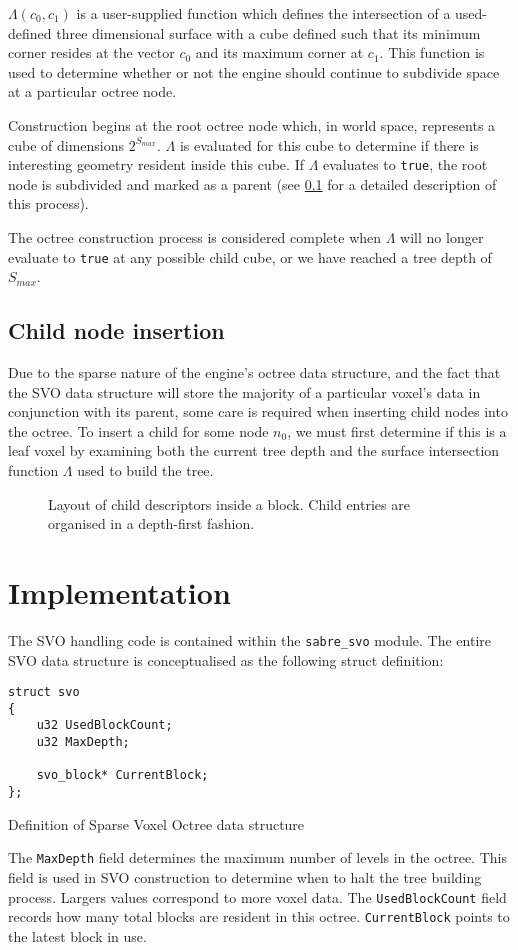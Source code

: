 $\Lambda(c_0, c_1)$ is a user-supplied function which defines the intersection of a used-defined three dimensional surface with a cube defined such that its minimum corner resides at the vector $c_0$ and its maximum corner at $c_1$. This function is used to determine whether or not the engine should continue to subdivide space at a particular octree node.

Construction begins at the root octree node which, in world space, represents a cube of dimensions $2^{S_{max}}$. $\Lambda$ is evaluated for this cube to determine if there is interesting geometry resident inside this cube. If $\Lambda$ evaluates to \texttt{true}, the root node is subdivided and marked as a parent (see \ref{child_node_insertion} for a detailed description of this process).

The octree construction process is considered complete when $\Lambda$ will no longer evaluate to \texttt{true} at any possible child cube, or we have reached a tree depth of $S_{max}$.

\subsection{Child node insertion} \label{child_node_insertion}
Due to the sparse nature of the engine's octree data structure, and the fact that the SVO data structure will store the majority of a particular voxel's data in conjunction with its parent, some care is required when inserting child nodes into the octree. To insert a child for some node $n_0$, we must first determine if this is a leaf voxel by examining both the current tree depth and the surface intersection function $\Lambda$ used to build the tree.

\begin{figure}[ht]
    \centering
    \footnotesize
    
    \caption{Layout of child descriptors inside a block. Child entries are organised in a depth-first fashion.}
    \label{fig:quadtree_analogue}
\end{figure}

\section{Implementation}
The SVO handling code is contained within the \texttt{sabre\_svo} module. The entire
SVO data structure is conceptualised as the following struct definition:

\begin{listing}[H]
\begin{verbatim}
struct svo
{
    u32 UsedBlockCount;
    u32 MaxDepth;

    svo_block* CurrentBlock;
};
\end{verbatim}
\caption{Definition of Sparse Voxel Octree data structure}
\end{listing}

The \texttt{MaxDepth} field determines the maximum number of levels in the octree. This field is used in SVO construction to determine when to halt the tree building process. Largers values correspond to more voxel data. The \texttt{UsedBlockCount} field records how many total blocks are resident in this octree. \texttt{CurrentBlock} points to the latest block in use. 